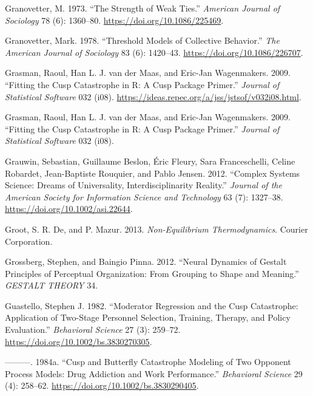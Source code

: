 \documentclass[
  a4paper,
  DIV=11,
  numbers=noendperiod,
  oneside]{scrreprt}
\newlength{\cslhangindent}
\newlength{\cslentryspacingunit} %
\newenvironment{CSLReferences}[2] %
 {%
  \setlength{\parindent}{0pt}
  \ifodd #1
  \let\oldpar\par
  \def\par{\hangindent=\cslhangindent\oldpar}
  \fi
  \setlength{\parskip}{#2\cslentryspacingunit}
 }%
 {}
\begin{document}
\begin{CSLReferences}{1}{0}
\leavevmode{}%
Granovetter, M. 1973. {``The Strength of Weak Ties.''} \emph{American
Journal of Sociology} 78 (6): 1360--80.
\url{https://doi.org/10.1086/225469}.

\leavevmode{}%
Granovetter, Mark. 1978. {``Threshold {Models} of {Collective
Behavior}.''} \emph{The American Journal of Sociology} 83 (6): 1420--43.
\url{https://doi.org/10.1086/226707}.

\leavevmode{}%
Grasman, Raoul, Han L. J. van der Maas, and Eric-Jan Wagenmakers. 2009.
{``Fitting the Cusp Catastrophe in R: A Cusp Package Primer.''}
\emph{Journal of Statistical Software} 032 (i08).
\url{https://ideas.repec.org/a/jss/jstsof/v032i08.html}.

\leavevmode{}%
Grasman, Raoul, Han L. J. van der Maas, and Eric-Jan Wagenmakers. 2009.
{``Fitting the {Cusp Catastrophe} in {R}: {A} Cusp {Package Primer}.''}
\emph{Journal of Statistical Software} 032 (i08).

\leavevmode{}%
Grauwin, Sebastian, Guillaume Beslon, Éric Fleury, Sara Franceschelli,
Celine Robardet, Jean-Baptiste Rouquier, and Pablo Jensen. 2012.
{``Complex Systems Science: {Dreams} of Universality,
Interdisciplinarity Reality.''} \emph{Journal of the American Society
for Information Science and Technology} 63 (7): 1327--38.
\url{https://doi.org/10.1002/asi.22644}.

\leavevmode{}%
Groot, S. R. De, and P. Mazur. 2013. \emph{Non-Equilibrium
Thermodynamics}. Courier Corporation.

\leavevmode{}%
Grossberg, Stephen, and Baingio Pinna. 2012. {``Neural {Dynamics} of
{Gestalt Principles} of {Perceptual Organization}: {From Grouping} to
{Shape} and {Meaning}.''} \emph{GESTALT THEORY} 34.

\leavevmode{}%
Guastello, Stephen J. 1982. {``Moderator Regression and the Cusp
Catastrophe: {Application} of Two-Stage Personnel Selection, Training,
Therapy, and Policy Evaluation.''} \emph{Behavioral Science} 27 (3):
259--72. \url{https://doi.org/10.1002/bs.3830270305}.

\leavevmode{}%
---------. 1984a. {``Cusp and Butterfly Catastrophe Modeling of Two
Opponent Process Models: {Drug} Addiction and Work Performance.''}
\emph{Behavioral Science} 29 (4): 258--62.
\url{https://doi.org/10.1002/bs.3830290405}.


\end{CSLReferences}
\end{document}
